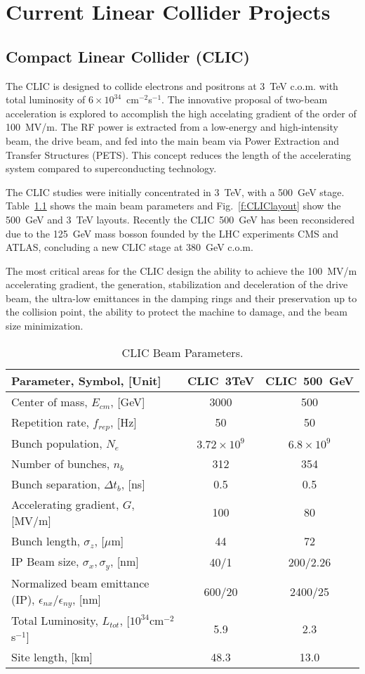 \chapter{Current Linear Collider Projects}\label{s:lincoll}

\section{Compact Linear Collider (CLIC)}
The CLIC \cite{CLICdes} is designed to collide electrons and positrons at 3~TeV c.o.m. with total luminosity of $6\times10^{34}$~cm$^{-2}$s$^{-1}$. The innovative proposal of two-beam acceleration is explored to accomplish the high accelating gradient of the order of 100~MV/m. The RF power is extracted from a low-energy and high-intensity beam, the drive beam, and fed into the main beam via Power Extraction and Transfer Structures (PETS). This concept reduces the length of the accelerating system compared to superconducting technology.\par
The CLIC studies were initially concentrated in 3~TeV, with a 500~GeV stage. Table~\ref{t:CLICparam} shows the main beam parameters and Fig.~\ref{f:CLIClayout} show the 500~GeV and 3~TeV layouts. Recently the CLIC~500~GeV has been reconsidered due to the 125~GeV mass bosson founded by the LHC experiments CMS and ATLAS, concluding a new CLIC stage at 380~GeV c.o.m.\par
The most critical areas for the CLIC design the ability to achieve the 100~MV/m accelerating gradient, the generation, stabilization and deceleration of the drive beam, the ultra-low emittances in the damping rings and their preservation up to the collision point, the ability to protect the machine to damage, and the beam size minimization.\par
\begin{table}[h]
 \centering
 \begin{tabular}{l||c|c}\hline
 Parameter, Symbol, [Unit] & CLIC~3TeV & CLIC~500~GeV \\\hline\hline
 Center of mass, $E_{cm}$, [GeV] & 3000 & 500\\
 Repetition rate, $f_{rep}$, [Hz] & 50 & 50\\
 Bunch population, $N_e$  & $3.72\times10^9$ & $6.8\times10^9$\\
 Number of bunches, $n_b$ & 312 & 354 \\
 Bunch separation, $\Delta t_b$, [ns] & 0.5 & 0.5\\
 Accelerating gradient, $G$, [MV/m] & 100 & 80\\
 Bunch length, 	$\sigma_z$, [$\mu$m] & 44 & 72 \\
 IP Beam size, $\sigma_x,\sigma_y$, [nm] & 40/1 & 200/2.26\\
 Normalized beam emittance (IP), $\epsilon_{nx}/\epsilon_{ny}$, [nm] & 600/20 & 2400/25\\
 Total Luminosity, $L_{tot}$, [$10^{34}$cm$^{-2}$s$^{-1}$] & 5.9 & 2.3\\
 Site length, [km] & 48.3 & 13.0\\\hline
 \end{tabular}\caption{CLIC Beam Parameters.}\label{t:CLICparam}
\end{table}
